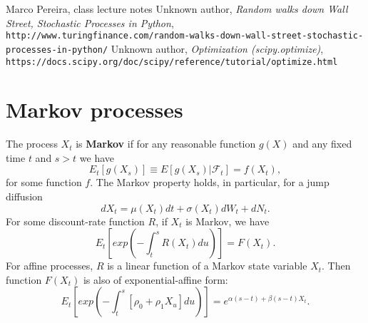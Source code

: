 \documentclass[a4paper,twoside,10pt]{report}
\begin{document}
\begin{thebibliography}{9}
 Marco Pereira, class lecture notes
 Unknown author, \textit{Random walks down Wall Street, Stochastic Processes in Python}, \\\texttt{http://www.turingfinance.com/random-walks-down-wall-street-stochastic-processes-in-python/}
 Unknown author, \textit{Optimization (scipy.optimize)}, \\\texttt{https://docs.scipy.org/doc/scipy/reference/tutorial/optimize.html}

\end{thebibliography}


\appendix
\chapter{Markov processes}
The process $X_t$ is \textbf{Markov} if for any reasonable function $g(X)$ and any fixed time $t$ and $s > t$ we have \[ E_t[g(X_s)] \equiv E[g(X_s)|\mathcal{F}_t] = f(X_t),\] for some function $f$. The Markov property holds, in particular, for a jump diffusion \[ dX_t = \mu(X_t)dt + \sigma(X_t)dW_t + dN_t.\] For some discount-rate function $R$, if $X_t$ is Markov, we have \[ E_t[exp(- \int_{t}^{s} R(X_t)du)] = F(X_t). \] For affine processes, $R$ is a linear function of a Markov state variable $X_t$. Then function $F(X_t)$ is also of exponential-affine form: \[ E_t[exp(- \int_{t}^{s}[\rho_0 + \rho_1 X_u]du)] = e^{\alpha(s-t)+\beta(s-t)X_t}.\]
\end{document}
